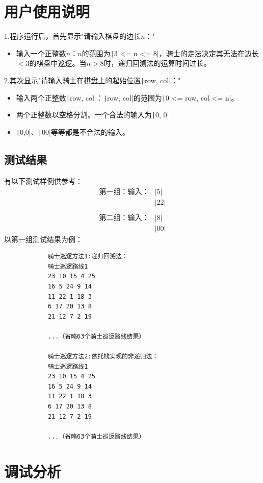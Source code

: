 \documentclass[10pt,a4paper]{article}
\begin{document}
	\section{用户使用说明}
	\noindent 1.程序运行后，首先显示"请输入棋盘的边长$n$："
	\begin{itemize}
		\item 输入一个正整数$n$：$n$的范围为\texttt|3 <= n <= 8|，骑士的走法决定其无法在边长$<3$的棋盘中巡逻。当$n>8$时，递归回溯法的运算时间过长。
	\end{itemize}
	\noindent 2.其次显示"请输入骑士在棋盘上的起始位置\texttt|row, col|："
	\begin{itemize}
		\item 输入两个正整数\texttt|row, col|：\texttt|row, col|的范围为\texttt|0 <= row, col <= n|。
		\item 两个正整数以空格分割。一个合法的输入为\texttt|0, 0|
		\item \texttt|0,0|、\texttt|00|等等都是不合法的输入。
	\end{itemize}
	\subsection{测试结果}
	\noindent 有以下测试样例供参考：
	\begin{align*}
		\text{第一组：输入：}&\texttt|5|\\
		&\texttt|2 2|\\
		\\
		\text{第二组：输入：}&\texttt|8|\\
		&\texttt|0 0|
	\end{align*}
	以第一组测试结果为例：
	\begin{verbatim}
			骑士巡逻方法1:递归回溯法：
			骑士巡逻路线1
			23 10 15 4 25 
			16 5 24 9 14 
			11 22 1 18 3 
			6 17 20 13 8 
			21 12 7 2 19 

			...（省略63个骑士巡逻路线结果）

			骑士巡逻方法2:依托栈实现的非递归法：
			骑士巡逻路线1
			23 10 15 4 25 
			16 5 24 9 14 
			11 22 1 18 3 
			6 17 20 13 8 
			21 12 7 2 19 

			...（省略63个骑士巡逻路线结果）
	\end{verbatim}
	\newpage
	\section{调试分析}
\end{document}
